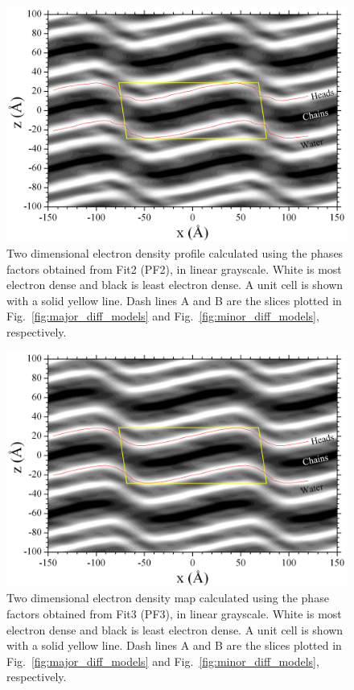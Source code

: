 \begin{landscape}
\begin{figure}[htbp]
  \centering
  \includegraphics[width=0.85\linewidth]{figures/ripple/LAXS/Fit2_2D_edp}
  \caption[Two dimensional electron density map calculated using the phase
  factors obtained from Fit2 (PF2)]
  {Two dimensional electron density profile calculated using the phases
  factors obtained from Fit2 (PF2), in linear grayscale.
  White is most electron dense and black is least electron dense. 
  A unit cell is shown with a solid yellow line. 
  Dash lines A and B are the slices plotted in  Fig.~\ref{fig:major_diff_models} 
  and Fig.~\ref{fig:minor_diff_models}, respectively.}
  \label{fig:PF2_2D_edp}
\end{figure}
\end{landscape}

\begin{landscape}
\begin{figure}
  \centering
  \includegraphics[width=0.85\linewidth]{figures/ripple/LAXS/Fit3_2D_edp}
  \caption[]{Two dimensional electron density map calculated using the phase
  factors obtained from Fit3 (PF3), in linear grayscale.
  White is most electron dense and black is least electron dense. 
  A unit cell is shown with a solid yellow line. 
  Dash lines A and B are the slices plotted in  Fig.~\ref{fig:major_diff_models} 
  and Fig.~\ref{fig:minor_diff_models}, respectively.}
  \label{fig:PF3_2D_edp}
\end{figure}
\end{landscape}

